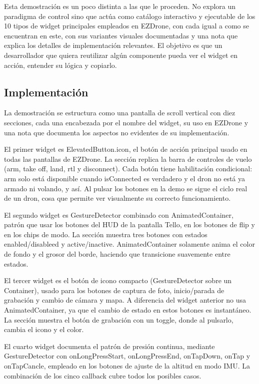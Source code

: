 Esta demostración es un poco distinta a las que le proceden. No explora un paradigma de control sino que actúa como catálogo interactivo y ejecutable de los 10 tipos de widget principales empleados en EZDrone, con cada igual a como se encuentran en este, con sus variantes visuales documentadas y una nota que explica los detalles de implementación relevantes. El objetivo es que un desarrollador que quiera reutilizar algún componente pueda ver el widget en acción, entender su lógica y copiarlo.

\subsection{Implementación}
La demostración se estructura como una pantalla de scroll vertical con diez secciones, cada una encabezada por el nombre del widget, su uso en EZDrone y una nota que documenta los aspectos no evidentes de su implementación.

El primer widget es ElevatedButton.icon, el botón de acción principal usado en todas las pantallas de EZDrone. La sección replica la barra de controles de vuelo (arm, take off, land, rtl y disconnect). Cada botón tiene habilitación condicional: arm solo está disponible cuando isConnected es verdadero y el dron no está ya armado ni volando, y así. Al pulsar los botones en la demo se sigue el ciclo real de un dron, cosa que permite ver visualmente su correcto funcionamiento.

El segundo widget es GestureDetector combinado con AnimatedContainer, patrón que usar los botones del HUD de la pantalla Tello, en los botones de flip y en los chips de modo. La sección muestra tres botones con estados enabled/disableed y active/inactive. AnimatedContainer solamente anima el color de fondo y el grosor del borde, haciendo que transicione suavemente entre estados.

El tercer widget es el botón de icono compacto (GestureDetector sobre un Container), usado para los botones de captura de foto, inicio/parada de grabación y cambio de cámara y mapa. A diferencia del widget anterior no usa AnimatedContainer, ya que el cambio de estado en estos botones es instantáneo. La sección muestra el botón de grabación con un toggle, donde al pulsarlo, cambia el icono y el color.

El cuarto widget documenta el patrón de presión continua, mediante GestureDetector con onLongPressStart, onLongPressEnd, onTapDown, onTap y onTapCancle, empleado en los botones de ajuste de la altitud en modo IMU. La combinación de los cinco callback cubre todos los posibles casos. 

